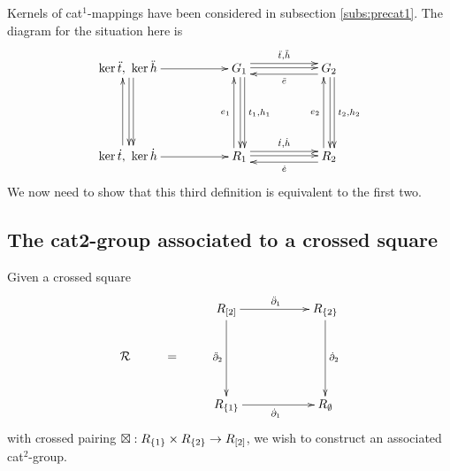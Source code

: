 Kernels of cat$^1$-mappings have been considered in 
subsection \ref{subs:precat1}. 
The diagram for the situation here is 
\begin{equation*} \label{eq:cat2cker}
\vcenter{\xymatrix{
   \ker\ddtt,\ \ker\ddhh \ar[rr] \ar[dd]<1.0ex> \ar[dd]<0.2ex> 
     && G_1 \ar[dd]<1.0ex>^{t_1,h_1} \ar[dd]<0.2ex> 
            \ar[rr]<1.0ex>^{\ddtt,\ddhh} \ar[rr]<0.2ex> 
          && G_2 \ar[dd]<1.0ex>^{t_2,h_2} \ar[dd]<0.2ex>  
             \ar[ll]<1.0ex>^{\ddee}  \\
     &&  \\
   \ker\dtt,\ \ker\dhh \ar[rr] \ar[uu]<1.0ex> 
     && R_1 \ar[uu]<1.0ex>^{e_1} \ar[rr]<1.0ex>^{\dtt,\dhh} \ar[rr]<0.2ex>
          && R_2 \ar[uu]<1.0ex>^{e_2} 
             \ar[ll]<1.0ex>^{\dee}
}}
\end{equation*}
\medskip
We now need to show that this third definition is equivalent to the first two. 


\newpage
\subsection{The cat2-group associated to a crossed square} 
\label{sect:cat2-xsq}


Given a crossed square
\begin{equation} \label{eq:RsquareR}
\vcenter{\xymatrix{
        &   &    R_{[2]} \ar[rr]^{\ddbdyo} \ar[dd]_{\ddbdyt}
             &&  R_{\{2\}} \ar[dd]^{\dbdyt} \\
  \calR & = &&&  \\
        &   &    R_{\{1\}} \ar[rr]_{\dbdyo}
             &&  R_{\emptyset}
}}
\end{equation}
with crossed pairing $\boxtimes: R_{\{1\}} \times R_{\{2\}} \to R_{[2]}$, 
we wish to construct an associated cat$^2$-group.

